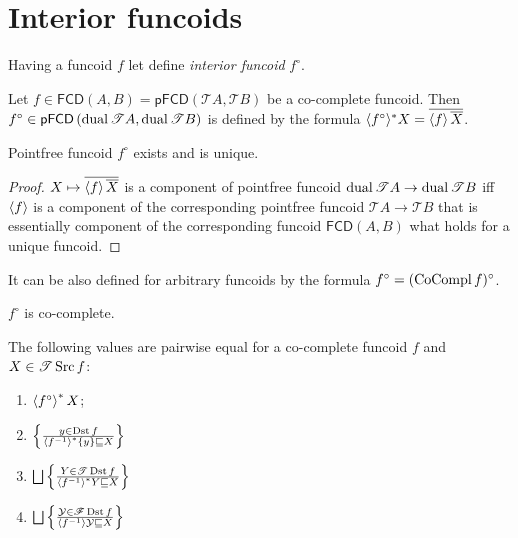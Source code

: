 \chapter{Interior funcoids}

Having a funcoid $f$ let define \emph{interior funcoid} $f^{\circ}$.

\begin{defn}
  Let $f \in \mathsf{\mathsf{FCD}} (A , B) = \mathsf{\mathsf{pFCD}} \left(
  \mathscr{T} A , \mathscr{T} B \right)$ be a co-complete funcoid. Then
  $f^{\circ} \in \mathsf{\mathsf{pFCD}} \left( \operatorname{dual} \mathscr{T} A ,
  \operatorname{dual} \mathscr{T} B \right)$ is defined by the formula $\langle
  f^{\circ} \rangle^{\ast} X = \overline{\left\langle f\right\rangle
  \overline{X}}$.
\end{defn}

\begin{prop}
  Pointfree funcoid $f^{\circ}$ exists and is unique.
\end{prop}

\begin{proof}
  $X \mapsto \overline{\left\langle f\right\rangle \overline{X}}$ is a component
  of pointfree funcoid $\operatorname{dual} \mathscr{T} A \rightarrow \operatorname{dual}
  \mathscr{T} B$ iff $\left\langle f\right\rangle$ is a component of the
  corresponding pointfree funcoid $\mathscr{T} A \rightarrow \mathscr{T} B$
  that is essentially component of the corresponding funcoid
  $\mathsf{\mathsf{FCD}} (A , B)$ what holds for a unique funcoid.
\end{proof}

It can be also defined for arbitrary funcoids by the formula $f^{\circ} =
(\operatorname{CoCompl} f)^{\circ}$.

\begin{obvious}
$f^{\circ}$ is co-complete.
\end{obvious}

\begin{thm}
  The following values are pairwise equal for a co-complete funcoid $f$ and $X
  \in \mathscr{T} \operatorname{Src} f$:
  \begin{enumerate}
    \item\label{int-simpl} $\left\langle f^{\circ}\right\rangle ^{\ast} X$;
    
    \item\label{int-set} $\left\{ \frac{ y \in \operatorname{Dst} f }{ \left\langle  f^{-
    1} \right\rangle ^{\ast} \{ y \} \sqsubseteq X }\right\}$
    
    \item\label{int-sset-set} $\bigsqcup \setcond{ Y \in \mathscr{T} \Dst f }{
    \rsupfun{f^{- 1}} Y \sqsubseteq X }$
    
    \item\label{int-sset-flt} $\bigsqcup \setcond{ \mathcal{Y} \in \mathscr{F} \Dst f
    }{ \supfun{f^{- 1}} \mathcal{Y}
    \sqsubseteq X }$
  \end{enumerate}
\end{thm}

